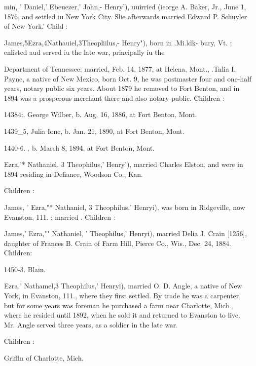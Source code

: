 \documentclass[oneside]{book}
\begin{document}
min, ' Daniel,' Ebeuezer,' John,- Henry'), uuirried (ieorge A. 
Baker, Jr., June 1, 1876, and settled iu New York City. Slie 
afterwards married Edward P. Schuyler of New York.' Child : 


James,5Ezra,4Nathauiel,3Theopliilus,- Henry"), born in .Mi.ldk- 
bury, Vt. ; enlisted aud served iu the late war, principally iu the 




Department of Tennessee; married, Feb. 14, 1877, at Helena, 
Mont., .Tnlia I. Payne, a native of New Mexico, born Oct. 9, 
he was postmaster four and one-half years, notary public six 
years. About 1879 he removed to Fort Benton, and in 1894 was 
a prosperous merchant there and also notary public. Children : 




14384:. George Wilber, b. Aug. 16, 1886, at Fort Benton, Mont. 

1439\_5, Julia Ione, b. Jan. 21, 1890, at Fort Benton, Mont. 

1440-6. , b. March 8, 1894, at Fort Benton, Mont. 

Ezra,'* Nathaniel, 3 Theophilus,' Henry'), married Charles Elston, 
and were in 1894 residing in Defiance, Woodson Co., Kan. 

Children : 






James, ' Ezra,"* Nathaniel, 3 Theophilus,' Henryi), was born in 
Ridgeville, now Evanston, 111. ; married . Children : 





James,' Ezra,"" Nathaniel, ' Theophilus,' Henryi), married Delia 
J. Crain [1256], daughter of Frances B. Crain of Farm Hill, 
Pierce Co., Wis., Dec. 24, 1884. Children: 

1450-3. Blain. 

Ezra,' Nathamel,3 Theophilus,' Henryi), married O. D. Angle, 
a native of New York, in Evanston, 111., where they first settled. 
By trade he was a carpenter, but for some years was foreman 
he purchased a farm near Charlotte, Mich., where he resided 
until 1892, when he sold it and returned to Evanston to live. 
Mr. Angle served three years, as a soldier in the late war. 

Children : 



Griffln of Charlotte, Mich. 
\end{document}
